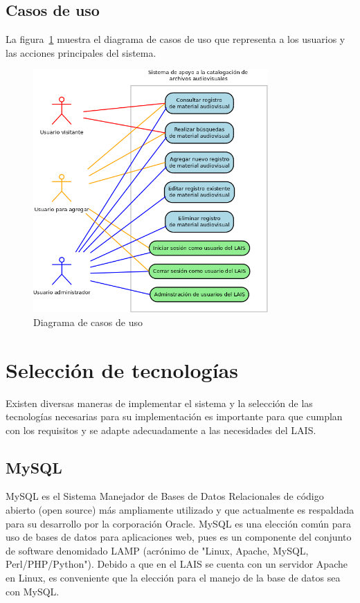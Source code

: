 \documentclass[10pt,letterpaper]{article}
\begin{document}
\subsection{Casos de uso}
La figura~\ref{fig:caso_de_uso} muestra el diagrama de casos de uso que representa a los usuarios y las acciones principales del sistema.
\begin{figure}[H]
	\centering
	\includegraphics[width=0.8\textwidth]{CasosDeUso.png}
	\caption{Diagrama de casos de uso}
	\label{fig:caso_de_uso}
\end{figure}

\section{Selección de tecnologías}
Existen diversas maneras de implementar el sistema y la selección de las tecnologías necesarias para su implementación es importante para que cumplan con los requisitos y se adapte adecuadamente a las necesidades del LAIS.
\subsection{MySQL}
MySQL es el Sistema Manejador de Bases de Datos Relacionales de código abierto (open source) más ampliamente utilizado y que actualmente es respaldada para su desarrollo por la corporación Oracle.
MySQL es una elección común para uso de bases de datos para aplicaciones web, pues es un componente del conjunto de software denomidado LAMP (acrónimo de "Linux, Apache, MySQL, Perl/PHP/Python"). Debido a que en el LAIS se cuenta con un servidor Apache en Linux, es conveniente que la elección para el manejo de la base de datos sea con MySQL.
\end{document}

